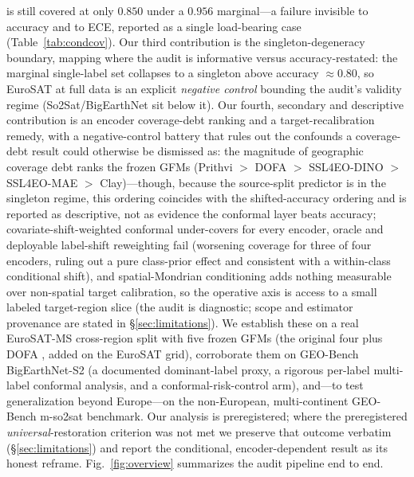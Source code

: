 \documentclass[journal]{IEEEtran}
\renewcommand{\_}{\textunderscore\allowbreak}
\begin{document}
is still covered at only $0.850$ under a $0.956$ marginal---a failure invisible to accuracy and to ECE,
reported as a single load-bearing case (Table~\ref{tab:condcov}). Our third contribution is the
singleton-degeneracy boundary, mapping where the audit is informative versus accuracy-restated: the
marginal single-label set collapses to a singleton above accuracy $\approx0.80$, so EuroSAT at full data
is an explicit \emph{negative control} bounding the audit's validity regime (So2Sat/BigEarthNet sit below
it). Our fourth, secondary and descriptive contribution is an encoder coverage-debt ranking and a
target-recalibration remedy, with a negative-control battery that rules out the confounds a coverage-debt
result could otherwise be dismissed as: the magnitude of geographic coverage debt ranks the frozen GFMs
(Prithvi $>$ DOFA \citep{xiong2024dofa} $>$ SSL4EO-DINO $>$ SSL4EO-MAE $>$ Clay)---though, because the
source-split predictor is in the singleton regime, this ordering coincides with the
shifted-accuracy ordering and is reported as descriptive, not as evidence the conformal layer beats
accuracy; covariate-shift-weighted conformal under-covers for every encoder, oracle and deployable
label-shift reweighting fail (worsening coverage for three of four encoders, ruling out a pure class-prior
effect and consistent with a within-class conditional shift), and spatial-Mondrian conditioning adds
nothing measurable over non-spatial target calibration, so the operative axis is access to a small labeled
target-region slice (the audit is diagnostic; scope and estimator provenance are stated in \S\ref{sec:limitations}). We establish these on a real EuroSAT-MS \citep{helber2019eurosat}
cross-region split with five frozen GFMs (the original four plus DOFA \citep{xiong2024dofa}, added on the EuroSAT grid),
corroborate them on GEO-Bench BigEarthNet-S2 \citep{lacoste2023geobench}
(a documented dominant-label proxy, a rigorous per-label multi-label conformal analysis, and a
conformal-risk-control arm), and---to test generalization beyond Europe---on the non-European,
multi-continent GEO-Bench m-so2sat benchmark. Our analysis is preregistered; where the preregistered
\emph{universal}-restoration criterion was not met we preserve that outcome verbatim
(\S\ref{sec:limitations}) and report the conditional, encoder-dependent result as its honest reframe.
Fig.~\ref{fig:overview} summarizes the audit pipeline end to end.
\end{document}
